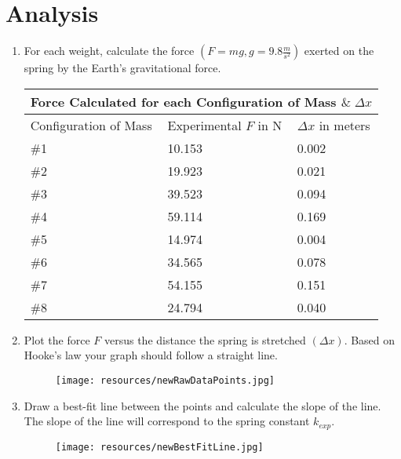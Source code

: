 \chapter{Analysis}

\begin{enumerate}
  \item For each weight, calculate the force $(F = mg, g = 9.8\frac{m}{s^2})$ exerted on
        the spring by the Earth's gravitational force.
	\begin{center}
  	\begin{tabular} { |p{2cm}|p{2cm}|p{2cm}| }
			\hline
  		\multicolumn{3}{|c|}{Force Calculated for each Configuration of Mass $\& \; \Delta x$} \\
			\hline 
			\centering Configuration of Mass & Experimental $F$ in N & $\Delta x$ in meters \\ 
			\hline
			\#1 & 10.153 & 0.002 \\
			\hline
			\#2 & 19.923 & 0.021 \\
			\hline
			\#3 & 39.523 & 0.094 \\
			\hline
			\#4 & 59.114 & 0.169 \\
			\hline
			\#5 & 14.974 & 0.004 \\
			\hline
			\#6 & 34.565 & 0.078 \\
			\hline
			\#7 & 54.155 & 0.151 \\
			\hline
			\#8 & 24.794 & 0.040 \\
			\hline
    \end{tabular}
	\end{center}

  \item Plot the force $F$ versus the distance the spring is stretched $(\Delta x)$.
        Based on Hooke's law your graph should follow a straight line.

			\begin{center}
				\begin{figure}[h!]
					\centerline{\texttt{[image: resources/newRawDataPoints.jpg]}}
				\end{figure}
			\end{center}

  \item Draw a best-fit line between the points and calculate the slope of the line.
        The slope of the line will correspond to the spring constant $k_{exp}$.

			\begin{center}
				\begin{figure}[h!]
					\centerline{\texttt{[image: resources/newBestFitLine.jpg]}}
				\end{figure}
			\end{center}
\end{enumerate}
\restoregeometry